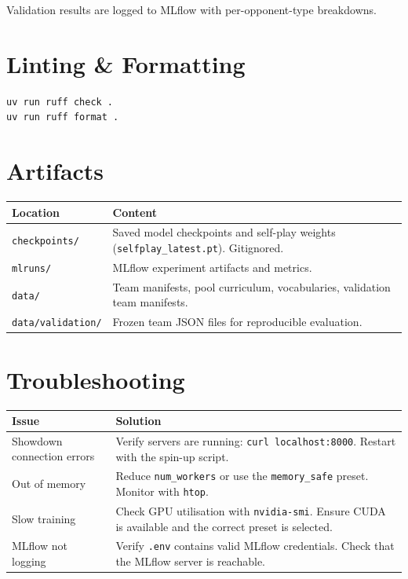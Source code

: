 Validation results are logged to MLflow with per-opponent-type breakdowns.

\section{Linting \& Formatting}

\begin{lstlisting}[language=bash]
uv run ruff check .
uv run ruff format .
\end{lstlisting}

\section{Artifacts}

\begin{center}
\small
\begin{tabularx}{\textwidth}{l X}
  \toprule
  \textbf{Location} & \textbf{Content} \\
  \midrule
  \texttt{checkpoints/}     & Saved model checkpoints and self-play weights
                              (\texttt{selfplay\_latest.pt}).  Gitignored. \\
  \texttt{mlruns/}          & MLflow experiment artifacts and metrics. \\
  \texttt{data/}            & Team manifests, pool curriculum, vocabularies,
                              validation team manifests. \\
  \texttt{data/validation/} & Frozen team JSON files for reproducible
                              evaluation. \\
  \bottomrule
\end{tabularx}
\end{center}

\section{Troubleshooting}

\begin{center}
\small
\begin{tabularx}{\textwidth}{l X}
  \toprule
  \textbf{Issue} & \textbf{Solution} \\
  \midrule
  Showdown connection errors &
    Verify servers are running: \texttt{curl localhost:8000}.  Restart with
    the spin-up script. \\
  Out of memory &
    Reduce \texttt{num\_workers} or use the \texttt{memory\_safe} preset.
    Monitor with \texttt{htop}. \\
  Slow training &
    Check GPU utilisation with \texttt{nvidia-smi}.  Ensure CUDA is
    available and the correct preset is selected. \\
  MLflow not logging &
    Verify \texttt{.env} contains valid MLflow credentials.  Check that
    the MLflow server is reachable. \\
  \bottomrule
\end{tabularx}
\end{center}

